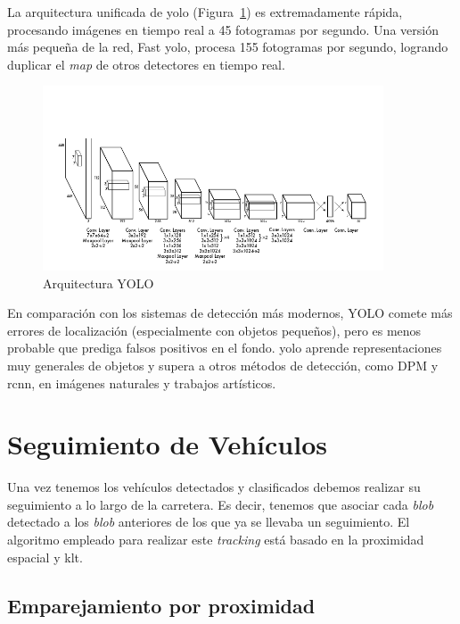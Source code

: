 La arquitectura unificada de \acrshort{yolo} (Figura~\ref{fig.yolov3}) es extremadamente rápida, procesando imágenes en tiempo real a 45 fotogramas por segundo. Una versión más pequeña de la red, Fast \acrshort{yolo}, procesa 155 fotogramas por segundo, logrando duplicar el \textit{\acrfull{map}} de otros detectores en tiempo real.

\begin{figure}[H] 
\begin{center}
	\includegraphics[width=0.9\textwidth]{figures/Diseno_global/yolov3.png}
   \caption{Arquitectura YOLO}
	\label{fig.yolov3}
\end{center}
\end{figure}

En comparación con los sistemas de detección más modernos, YOLO comete más errores de localización (especialmente con objetos pequeños), pero es menos probable que prediga falsos positivos en el fondo. \acrshort{yolo} aprende representaciones muy generales de objetos y supera a otros métodos de detección, como DPM y \acrshort{rcnn}, en imágenes naturales y trabajos artísticos.


\section{Seguimiento de Vehículos}\label{sec.seguimiento}

Una vez tenemos los vehículos detectados y clasificados debemos realizar su seguimiento a lo largo de la carretera. Es decir, tenemos que asociar cada \textit{blob} detectado a los \textit{blob} anteriores de los que ya se llevaba un seguimiento. El algoritmo empleado para realizar este \textit{tracking} está basado en la proximidad espacial y \acrshort{klt}. 

\subsection{Emparejamiento por proximidad}

